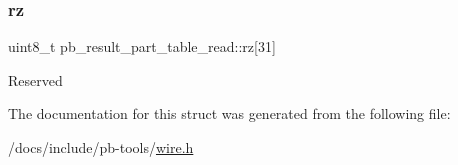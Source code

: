 \subsubsection{\texorpdfstring{rz}{rz}}
{\footnotesize\ttfamily uint8\+\_\+t pb\+\_\+result\+\_\+part\+\_\+table\+\_\+read\+::rz\mbox{[}31\mbox{]}}

Reserved 

The documentation for this struct was generated from the following file\+:\begin{DoxyCompactItemize}
\item 
/docs/include/pb-\/tools/\hyperlink{wire_8h}{wire.\+h}\end{DoxyCompactItemize}
